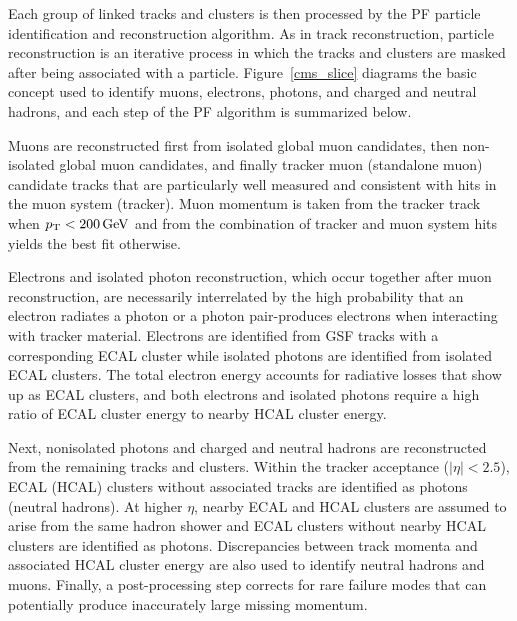 Each group of linked tracks and clusters is then processed by the PF particle identification and reconstruction algorithm. As in track reconstruction, particle reconstruction is an iterative process in which the tracks and clusters are masked after being associated with a particle. Figure~\ref{cms_slice} diagrams the basic concept used to identify muons, electrons, photons, and charged and neutral hadrons, and each step of the PF algorithm is summarized below.

Muons are reconstructed first from isolated global muon candidates, then non-isolated global muon candidates, and finally tracker muon (standalone muon) candidate tracks that are particularly well measured and consistent with hits in the muon system (tracker). Muon momentum is taken from the tracker track when $\pt<\SI{200}{\GeV}$ and from the combination of tracker and muon system hits yields the best fit otherwise.

Electrons and isolated photon reconstruction, which occur together after muon reconstruction, are necessarily interrelated by the high probability that an electron radiates a photon or a photon pair-produces electrons when interacting with tracker material. Electrons are identified from GSF tracks with a corresponding ECAL cluster while isolated photons are identified from isolated ECAL clusters. The total electron energy accounts for radiative losses that show up as ECAL clusters, and both electrons and isolated photons require a high ratio of ECAL cluster energy to nearby HCAL cluster energy.

Next, nonisolated photons and charged and neutral hadrons are reconstructed from the remaining tracks and clusters. Within the tracker acceptance ($|\eta|<2.5$), ECAL (HCAL) clusters without associated tracks are identified as photons (neutral hadrons). At higher $\eta$, nearby ECAL and HCAL clusters are assumed to arise from the same hadron shower and ECAL clusters without nearby HCAL clusters are identified as photons. Discrepancies between track momenta and associated HCAL cluster energy are also used to identify neutral hadrons and muons. Finally, a post-processing step corrects for rare failure modes that can potentially produce inaccurately large missing momentum.


